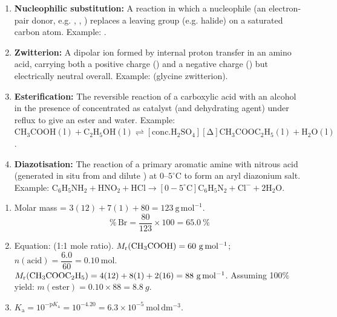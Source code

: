 \documentclass[11pt]{article}
\newcommand{\cle}[1]{{\popxbold\color{popdark}#1}}
\begin{document}
\begin{corrige}
\begin{enumerate}
\item \textbf{Nucleophilic substitution:} A reaction in which a \cle{nucleophile} (an electron-pair donor, e.g. , , ) replaces a \cle{leaving group} (e.g. halide) on a saturated carbon atom. Example: .
\item \textbf{Zwitterion:} A \cle{dipolar ion} formed by internal proton transfer in an amino acid, carrying both a positive charge () and a negative charge () but electrically neutral overall. Example:  (glycine zwitterion).
\item \textbf{Esterification:} The reversible reaction of a carboxylic acid with an alcohol in the presence of concentrated  as catalyst (and dehydrating agent) under \cle{reflux} to give an ester and water. Example: \ensuremath{\mathrm{CH_{3}COOH(l) + C_{2}H_{5}OH(l) \rightleftharpoons [conc. H_{2}SO_{4}][\Delta] CH_{3}COOC_{2}H_{5}(l) + H_{2}O(l)}}.
\item \textbf{Diazotisation:} The reaction of a primary aromatic amine with nitrous acid (generated in situ from  and dilute ) at $0$--$5^{\circ}\mathrm{C}$ to form an \cle{aryl diazonium salt}. Example: \ensuremath{\mathrm{C_{6}H_{5}NH_{2} + HNO_{2} + HCl \rightarrow [0-5^{\circ}\mathrm{C}] C_{6}H_{5}N_{2}+Cl^{-} + 2H_{2}O}}.
\end{enumerate}
\end{corrige}

\begin{corrige}
\begin{enumerate}
\item Molar mass  = $3(12) + 7(1) + 80 = 123\ \mathrm{g\,mol^{-1}}$.
\[ \%\,\mathrm{Br} = \frac{80}{123}\times 100 = 65.0\ \% \]
\item Equation:  (1:1 mole ratio).
$M_{\mathrm{r}}(\ce{CH3COOH}) = 60\ \mathrm{g\,mol^{-1}}$; $n(\text{acid}) = \dfrac{6.0}{60} = 0.10\ \mathrm{mol}$.
$M_{\mathrm{r}}(\ce{CH3COOC2H5}) = 4(12) + 8(1) + 2(16) = 88\ \mathrm{g\,mol^{-1}}$.
Assuming 100\% yield: $m(\text{ester}) = 0.10 \times 88 = \SI{8.8}{g}$.
\item $K_{\mathrm{a}} = 10^{-\mathrm{p}K_{\mathrm{a}}} = 10^{-4.20} = 6.3\times 10^{-5}\ \mathrm{mol\,dm^{-3}}$.
\end{enumerate}
\end{corrige}
\end{document}
